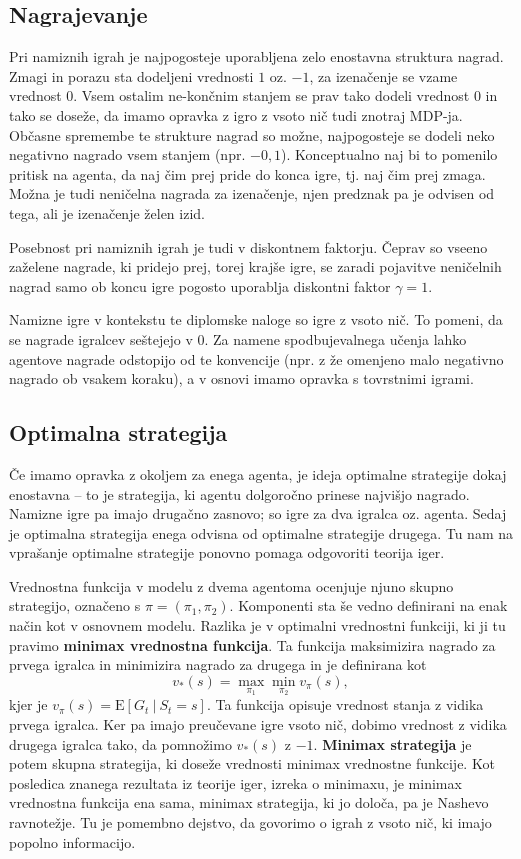 \documentclass[12pt,a4paper]{amsart}
\theoremstyle{definition} %
\theoremstyle{plain} %
\begin{document}
\subsection{Nagrajevanje}
Pri namiznih igrah je najpogosteje uporabljena zelo enostavna struktura nagrad. Zmagi in porazu sta 
dodeljeni vrednosti $1$ oz. $-1$, za izenačenje se vzame vrednost $0$. Vsem ostalim ne-končnim stanjem
se prav tako dodeli vrednost $0$ in tako se doseže, da imamo opravka z igro z vsoto nič tudi znotraj 
MDP-ja. Občasne spremembe te strukture nagrad so možne, najpogosteje se dodeli neko negativno nagrado 
vsem stanjem (npr. $-0,1$). Konceptualno naj bi to pomenilo pritisk na agenta, da naj čim prej pride do 
konca igre, tj. naj čim prej zmaga. Možna je tudi neničelna nagrada za izenačenje, njen predznak pa je 
odvisen od tega, ali je izenačenje želen izid. 

Posebnost pri namiznih igrah je tudi v diskontnem faktorju. Čeprav so vseeno zaželene nagrade, ki 
pridejo prej, torej krajše igre, se zaradi pojavitve neničelnih nagrad samo ob koncu igre pogosto 
uporablja diskontni faktor $\gamma = 1$.

Namizne igre v kontekstu te diplomske naloge so igre z vsoto nič. To pomeni, da se nagrade igralcev 
seštejejo v $0$. Za namene spodbujevalnega učenja lahko agentove nagrade odstopijo od te konvencije
(npr. z že omenjeno malo negativno nagrado ob vsakem koraku), a v osnovi imamo opravka s tovrstnimi 
igrami.

\subsection{Optimalna strategija}
Če imamo opravka z okoljem za enega agenta, je ideja optimalne strategije dokaj enostavna -- to
je strategija, ki agentu dolgoročno prinese najvišjo nagrado. Namizne igre pa imajo drugačno zasnovo; 
so igre za dva igralca oz. agenta. Sedaj je optimalna strategija enega odvisna od optimalne strategije 
drugega. Tu nam na vprašanje optimalne strategije ponovno pomaga odgovoriti teorija iger. 

Vrednostna funkcija v modelu z dvema agentoma ocenjuje njuno skupno strategijo, označeno s $\pi = (\pi_1, 
\pi_2)$. Komponenti sta še vedno definirani na enak način kot v osnovnem modelu. Razlika je v optimalni 
vrednostni funkciji, ki ji tu pravimo \textbf{minimax vrednostna funkcija}. Ta funkcija maksimizira 
nagrado za prvega igralca in minimizira nagrado za drugega in je definirana kot
$$
v_*(s) = \max_{\pi_1} \min_{\pi_2} v_\pi(s), 
$$
kjer je $v_\pi(s) = \mathrm{E} [G_t~|~S_t = s]$. Ta funkcija opisuje vrednost stanja z vidika prvega 
igralca. Ker pa imajo preučevane igre vsoto nič, dobimo vrednost z vidika drugega igralca tako, da 
pomnožimo $v_*(s)$ z $-1$. \textbf{Minimax strategija} je potem skupna strategija, 
ki doseže vrednosti minimax vrednostne funkcije. Kot posledica znanega rezultata iz teorije iger, 
izreka o minimaxu, je minimax vrednostna funkcija ena sama, minimax strategija, ki jo določa, pa je 
Nashevo ravnotežje. Tu je pomembno dejstvo, da govorimo o igrah z vsoto nič, ki imajo popolno 
informacijo.
\end{document}
